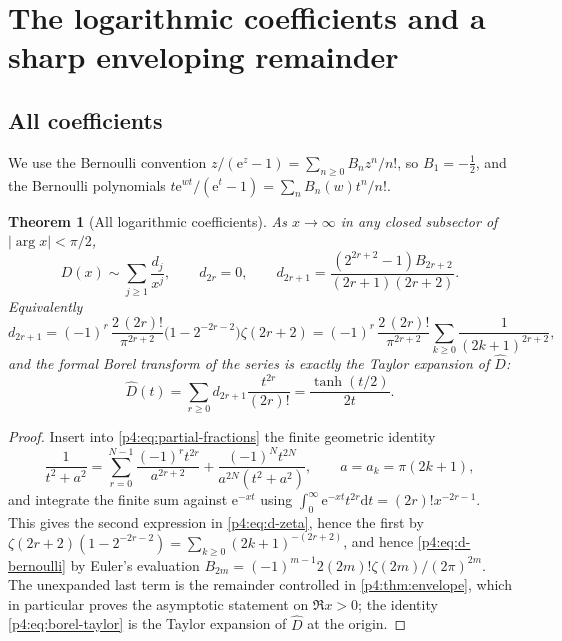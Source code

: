 \documentclass[11pt,a4paper,oneside]{book}
\theoremstyle{plain}
\newtheorem{theorem}{Theorem}[chapter]
\theoremstyle{definition}
\theoremstyle{remark}
\newcommand{\e}{\mathrm{e}}
\newcommand{\dd}{\mathrm{d}}
\begin{document}
\section{The logarithmic coefficients and a sharp enveloping remainder}
\label{p4:sec:logcoeffs}

\subsection{All coefficients}

We use the Bernoulli convention $z/(\e^z-1)=\sum_{n\ge0}B_nz^n/n!$, so
$B_1=-\tfrac12$, and the Bernoulli polynomials
$t\e^{wt}/(\e^t-1)=\sum_n B_n(w)t^n/n!$.

\begin{theorem}[All logarithmic coefficients]
\label{p4:thm:logcoeffs}
As $x\to\infty$ in any closed subsector of $|\arg x|<\pi/2$,
\begin{equation}
  D(x)\sim\sum_{j\ge1}\frac{d_j}{x^{j}},
  \qquad
  d_{2r}=0,
  \qquad
  d_{2r+1}=\frac{(2^{2r+2}-1)B_{2r+2}}{(2r+1)(2r+2)} .
  \label{p4:eq:d-bernoulli}
\end{equation}
Equivalently
\begin{equation}
  d_{2r+1}=(-1)^{r}\,\frac{2\,(2r)!}{\pi^{2r+2}}\bigl(1-2^{-2r-2}\bigr)
  \zeta(2r+2)
  =(-1)^{r}\,\frac{2\,(2r)!}{\pi^{2r+2}}
   \sum_{k\ge0}\frac{1}{(2k+1)^{2r+2}} ,
  \label{p4:eq:d-zeta}
\end{equation}
and the formal Borel transform of the series is exactly the Taylor expansion
of $\widehat D$:
\begin{equation}
  \widehat D(t)=\sum_{r\ge0}d_{2r+1}\frac{t^{2r}}{(2r)!}
  =\frac{\tanh(t/2)}{2t}.
  \label{p4:eq:borel-taylor}
\end{equation}
\end{theorem}

\begin{proof}
Insert into \cref{p4:eq:partial-fractions} the finite geometric identity
\[
  \frac1{t^2+a^2}=\sum_{r=0}^{N-1}\frac{(-1)^{r}t^{2r}}{a^{2r+2}}
   +\frac{(-1)^{N}t^{2N}}{a^{2N}(t^2+a^2)},
  \qquad a=a_k=\pi(2k+1),
\]
and integrate the finite sum against $\e^{-xt}$ using
$\int_0^\infty\e^{-xt}t^{2r}\dd t=(2r)!x^{-2r-1}$.  This gives the second
expression in \cref{p4:eq:d-zeta}, hence the first by
$\zeta(2r+2)(1-2^{-2r-2})=\sum_{k\ge0}(2k+1)^{-(2r+2)}$, and hence
\cref{p4:eq:d-bernoulli} by Euler's evaluation
$B_{2m}=(-1)^{m-1}2(2m)!\zeta(2m)/(2\pi)^{2m}$.  The unexpanded last term is
the remainder controlled in \cref{p4:thm:envelope}, which in particular proves
the asymptotic statement on $\Re x>0$; the identity \cref{p4:eq:borel-taylor}
is the Taylor expansion of $\widehat D$ at the origin.
\end{proof}
\end{document}
